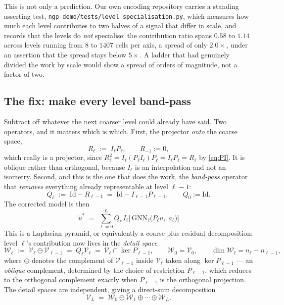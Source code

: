 \documentclass[11pt,a4paper]{article}
\newcommand{\Vs}{\mathcal{V}}
\newcommand{\Ws}{\mathcal{W}}
\newcommand{\Id}{\mathrm{Id}}
\begin{document}
\noindent
This is not only a prediction. Our own encoding repository carries a standing asserting test,
\texttt{ngp-demo/tests/level\_specialisation.py}, which measures how much each level
contributes to two halves of a signal that differ in scale, and records that the levels do
\emph{not} specialise: the contribution ratio spans $0.58$ to $1.14$ across levels running
from $8$ to $1407$ cells per axis, a spread of only $2.0\times$, under an assertion that the
spread stays below $5\times$. A ladder that had genuinely divided the work by scale would
show a spread of orders of magnitude, not a factor of two.

\subsection{The fix: make every level band-pass}
\label{sec:fix}

Subtract off whatever the next coarser level could already have said. Two operators, and it
matters which is which. First, the projector \emph{onto} the coarse space,
\begin{equation}
R_{\ell} \;:=\; I_{\ell} P_{\ell} ,
\qquad R_{-1} := 0 ,
\label{eq:R}
\end{equation}
which really is a projector, since $R_\ell^2 = I_\ell (P_\ell I_\ell) P_\ell = I_\ell
P_\ell = R_\ell$ by \eqref{eq:PI}. It is oblique rather than orthogonal, because $I_\ell$ is
an interpolation and not an isometry. Second, and this is the one that does the work, the
\emph{band-pass} operator that \emph{removes} everything already representable at level
$\ell-1$:
\begin{equation}
Q_{\ell} \;:=\; \Id - R_{\ell-1} \;=\; \Id - I_{\ell-1}P_{\ell-1} ,
\qquad Q_{0} := \Id .
\label{eq:Q}
\end{equation}
The corrected model is then
\begin{equation}
\boxed{\;
\dot u^{*} \;=\; \sum_{\ell=0}^{L}
Q_\ell\, I_\ell
\Big[\, \mathrm{GNN}_\ell\big(P_\ell u,\; a_\ell\big) \Big]
\;}
\label{eq:model-bandpass}
\end{equation}
This is a Laplacian pyramid, or equivalently a coarse-plus-residual decomposition: level
$\ell$'s contribution now lives in the \emph{detail space}
\begin{equation}
\Ws_\ell \;:=\; \Vs_\ell \ominus \Vs_{\ell-1}
\;=\; Q_\ell \Vs_\ell
\;=\; \Vs_\ell \cap \ker P_{\ell-1} ,
\qquad
\Ws_0 = \Vs_0 ,
\qquad \dim \Ws_\ell = n_\ell - n_{\ell-1} ,
\label{eq:Wspace}
\end{equation}
where $\ominus$ denotes the complement of $\Vs_{\ell-1}$ inside $\Vs_\ell$ taken along
$\ker P_{\ell-1}$ --- an \emph{oblique} complement, determined by the choice of restriction
$P_{\ell-1}$, which reduces to the orthogonal complement exactly when $P_{\ell-1}$ is the
orthogonal projection. The detail spaces are independent, giving a direct-sum decomposition
\begin{equation}
\Vs_L \;=\; \Ws_0 \oplus \Ws_1 \oplus \cdots \oplus \Ws_L .
\label{eq:directsum}
\end{equation}
\end{document}
